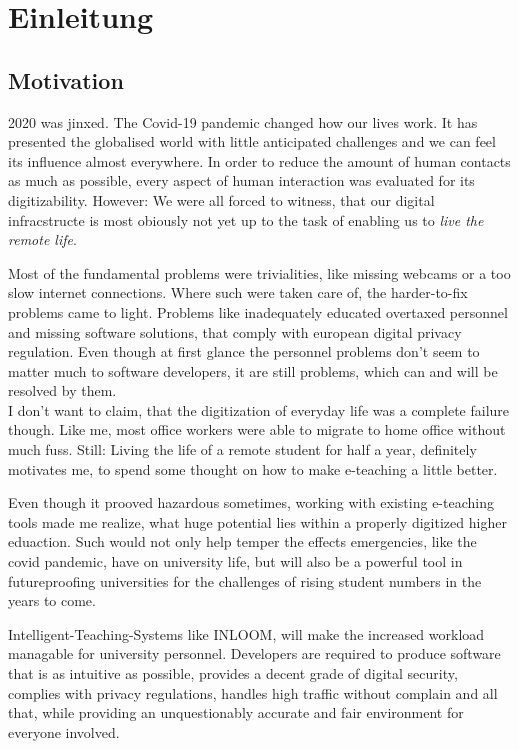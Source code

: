 \chapter{Einleitung}
\label{ch:introduction}

\section[Motivation]{Motivation}

2020 was jinxed. The Covid-19 pandemic changed how our lives work.
It has presented the globalised world with little anticipated challenges
and we can feel its influence almost everywhere. In order to reduce 
the amount of human contacts as much as possible, every aspect of
human interaction was evaluated for its digitizability. However: We were
all forced to witness, that our digital infracstructe is most obiously not
yet up to the task of enabling us to \textit{live the remote life}. 

Most of the fundamental problems were trivialities, like missing webcams or 
a too slow internet connections. Where such were taken care of, the harder-to-fix
problems came to light. Problems like inadequately educated overtaxed personnel 
and missing software solutions, that comply with european digital privacy regulation. 
Even though at first glance the personnel problems don't seem to matter much to 
software developers, it are still problems, which can and will be resolved by them.\\

I don't want to claim, that the digitization of everyday life was a complete
failure though. Like me, most office workers were able to migrate to home office 
without much fuss. Still: Living the life of a remote student for half a year,
definitely motivates me, to spend some thought on how to make e-teaching a 
little better. 

Even though it prooved hazardous sometimes, working with existing e-teaching 
tools made me realize, what huge potential lies within a properly digitized higher
eduaction. Such would not only help temper the effects emergencies, like the covid
pandemic, have on university life, but will also be a powerful tool in futureproofing
universities for the challenges of rising student numbers in the years to come.

Intelligent-Teaching-Systems like INLOOM, will make the increased workload managable
for university personnel. Developers are required to produce software that is as 
intuitive as possible, provides a decent grade of digital security, complies 
with privacy regulations, handles high traffic without complain and all that, while 
providing an unquestionably accurate and fair environment for everyone involved. 

